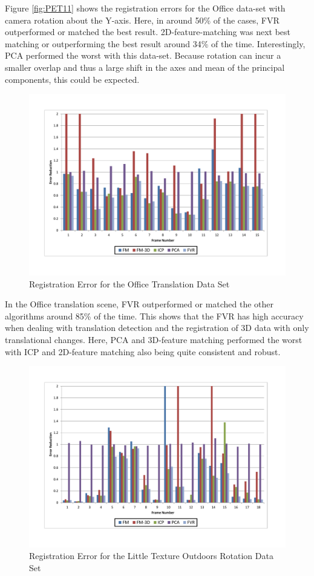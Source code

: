 Figure \ref{fig:PET11} shows the registration errors for the Office data-set with camera rotation about the Y-axis. Here, in around 50\% of the cases, FVR outperformed or matched the best result. 2D-feature-matching was next best matching or outperforming the best result around 34\% of the time. Interestingly, PCA performed the worst with this data-set. Because rotation can incur a smaller overlap and thus a large shift in the axes and mean of the principal components, this could be expected.

\begin{figure}[t]
\centering
\includegraphics[width=6.0in]{images/results/Office_Texture_Translation}
\caption{Registration Error for the Office Translation Data Set}
\label{fig:PET12}
\end{figure}

In the Office translation scene, FVR outperformed or matched the other algorithms around 85\% of the time. This shows that the FVR has high accuracy when dealing with translation detection and the registration of 3D data with only translational changes. Here, PCA and 3D-feature matching performed the worst with ICP and 2D-feature matching also being quite consistent and robust.

\begin{figure}[t]
\centering
\includegraphics[width=6.0in]{images/results/Outside_No_Texture_Rotation}
\caption{Registration Error for the Little Texture Outdoors Rotation Data Set}
\label{fig:PET13}
\end{figure}

